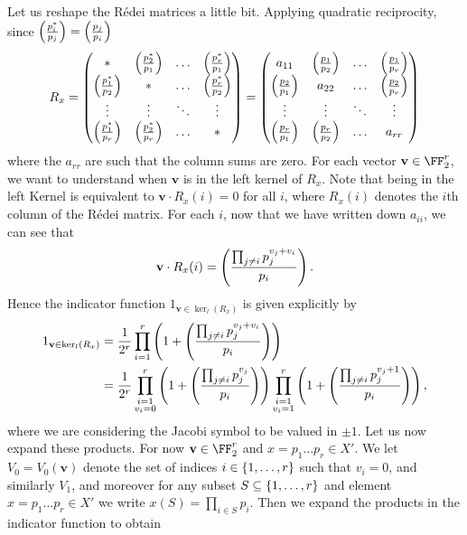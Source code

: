 \documentclass{lecturenotes}
\newcommand{\bv}{\mathbf{v}}
\newcommand{\kerl}{\ker_{l}}
\numberwithin{equation}{section}
\begin{document}
Let us reshape the R\'edei matrices a little bit.  Applying quadratic reciprocity, since $\left(\frac{p_i^*}{p_j}\right)=\left(\frac{p_j}{p_i}\right)$
\begin{equation}\label{eq:RedeiRevamp}
R_x=\begin{pmatrix}
    * & \left(\frac{p_2^*}{p_1}\right)&\dots &\left(\frac{p_r^*}{p_1}\right)\\
    \left(\frac{p_1^*}{p_2}\right)&* &\dots &\left(\frac{p_r^*}{p_2}\right)\\
    \vdots&\vdots&\ddots&\vdots\\
    \left(\frac{p_1^*}{p_r}\right)&\left(\frac{p_2^*}{p_r}\right) &\dots &*\\
\end{pmatrix}=
\begin{pmatrix}
    a_{11} & \left(\frac{p_1}{p_2}\right)&\dots &\left(\frac{p_1}{p_r}\right)\\
    \left(\frac{p_2}{p_1}\right)&a_{22} &\dots &\left(\frac{p_2}{p_r}\right)\\
    \vdots&\vdots&\ddots&\vdots\\
    \left(\frac{p_r}{p_1}\right)&\left(\frac{p_r}{p_2}\right) &\dots &a_{rr}\\
\end{pmatrix}
\end{equation}
where the $a_{rr}$ are such that the column sums are zero.  For each vector $\bv\in \FF_2^r$, we want to understand when $\bv$ is in the left kernel of $R_x$.  Note that being in the left Kernel is equivalent to $\bv\cdot R_x(i)=0$ for all $i$, where $R_x(i)$ denotes the $i$th column of the R\'edei matrix.  For each $i$, now that we have written down $a_{ii}$, we can see that
\[\bv\cdot R_x(i)=\art{\prod_{j\neq i}p_j^{v_j+v_i}}{p_i}.\]
Hence the indicator function $1_{\bv\in \kerl(R_x)}$ is given explicitly by
\begin{align*}
    1_{\bv\in \kerl(R_x)}&=\frac{1}{2^r}\prod_{i=1}^r\braces{1+\art{\prod_{j\neq i}p_j^{v_j+v_i}}{p_i}}\\
    &=\frac{1}{2^r}
    \prod_{\substack{i=1\\v_i=0}}^r\braces{1+\art{\prod_{j\neq i}p_j^{v_j}}{p_i}}
    \prod_{\substack{i=1\\v_i=1}}^r\braces{1+\art{\prod_{j\neq i}p_j^{v_j+1}}{p_i}},
\end{align*}
where we are considering the Jacobi symbol to be valued in $\pm 1$. 
Let us now expand these products.  For now $\bv\in \FF_2^r$ and $x=p_1\dots p_r\in X'$.  We let $V_0=V_0(\bv)$ denote the set of indices $i\in\left\{{1,\dots,r}\right\}$ such that $v_i=0$, and similarly $V_1$, and moreover for any subset $S\subseteq \left\{{1,\dots,r}\right\}$ and element $x=p_1\dots p_r\in X'$ we write $x(S)=\prod_{i\in S}p_i$.  Then we expand the products in the indicator function to obtain
\end{document}
